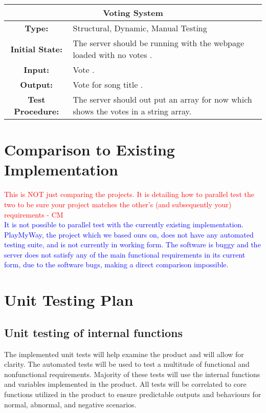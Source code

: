 \documentclass[12pt, titlepage]{article}
\begin{document}
\begin{center}
\begin{table}[H]
\begin{tabularx}{\textwidth}{| c X |}
\hline
\multicolumn{2}{|c|}{\textbf{Voting System}}\\
\hline
\textbf{Type: } & Structural, Dynamic, Manual Testing\\

\textbf{Initial State: } & The server should be running with the webpage loaded with no votes .\\

\textbf{Input: } & Vote .\\

\textbf{Output: } & Vote for song title .\\

\textbf{Test Procedure: } & The server should out put an array for now which shows the votes in a string array. \\
\hline
\end{tabularx}
\end{table}
\end{center}



	
\section{Comparison to Existing Implementation}	
\textcolor{red}{This is NOT just comparing the projects. It is detailing how to parallel test the two to be sure your project matches the other's (and subsequently your) requirements - CM} \\

\textcolor{blue}{
It is not possible to parallel test with the currently existing implementation. PlayMyWay, the project which we based ours on, does not have any automated testing suite, and is not currently in working form. The software is buggy and the server does not satisfy any of the main functional requirements in its current form, due to the software bugs, making a direct comparison impossible.
}
				
\section{Unit Testing Plan}
		
\subsection{Unit testing of internal functions}
The implemented unit tests will help examine the product and will allow for clarity. The automated tests will be used to test a multitude of functional and nonfunctional requirements.  Majority of these tests will use the internal functions and variables implemented in the product. All tests will be correlated to core functions utilized in the product to ensure predictable outputs and behaviours for normal, abnormal, and negative scenarios.
		
\end{document}
